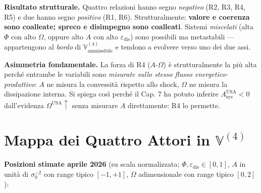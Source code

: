 \Proved{} \textbf{Risultato strutturale.} Quattro relazioni hanno segno
\emph{negativo} (R2, R3, R4, R5) e due hanno segno \emph{positivo} (R1,
R6). Strutturalmente: \textbf{valore e coerenza sono coalleate; spreco e
disimpegno sono coalleati}. Sistemi \emph{miscelati} (alta \(\Phi\) con
alto \(\Omega\), oppure alto \(A\) con alto
\(\varepsilon_{\text{dis}}\)) sono possibili ma metastabili ---
appartengono al \emph{bordo} di
\(\mathbb{V}^{(4)}_{\text{ammissibile}}\) e tendono a evolvere verso uno
dei due assi.

\Hypoth{} \textbf{Asimmetria fondamentale.} La forza di R4
(\(A\)-\(\Omega\)) è strutturalmente la più alta perché entrambe le
variabili sono \emph{misurate sullo stesso flusso
energetico-produttivo}: \(A\) ne misura la convessità rispetto allo
shock, \(\Omega\) ne misura la dissipazione interna. Si spiega così
perché il Cap. 7 ha potuto inferire \(A_{\text{sys}}^{\text{USA}} < 0\)
dall'evidenza \(\Omega^{\text{USA}} \uparrow\) senza misurare \(A\)
direttamente: R4 lo permette.



\section{\texorpdfstring{Mappa dei Quattro Attori in
\(\mathbb{V}^{(4)}\)}{Mappa dei Quattro Attori in \textbackslash mathbb\{V\}\^{}\{(4)\}}}\label{mappa-dei-quattro-attori-in-mathbbv4}

\Proved{} \textbf{Posizioni stimate aprile 2026} (su scala normalizzata;
\(\Phi, \varepsilon_{\text{dis}} \in [0,1]\), \(A\) in unità di
\(\sigma_0^{-2}\) con range tipico \([-1, +1]\), \(\Omega\)
adimensionale con range tipico \([0, 2]\)):

